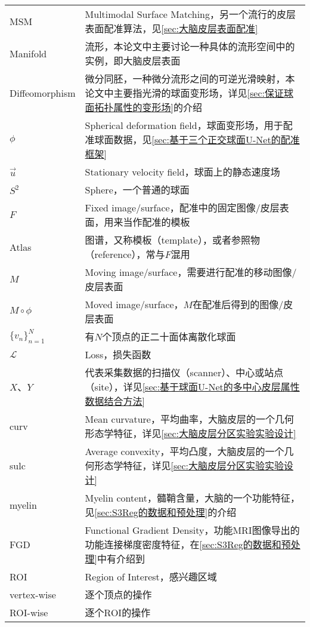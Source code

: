 \begin{center}
\begin{longtable}{>{\raggedleft}p{}  p{}}
            MSM & Multimodal Surface Matching，另一个流行的皮层表面配准算法，见\ref{sec:大脑皮层表面配准} \\
            Manifold & 流形，本论文中主要讨论一种具体的流形空间中的实例，即大脑皮层表面 \\
            Diffeomorphism & 微分同胚，一种微分流形之间的可逆光滑映射，本论文中主要指光滑的球面变形场，详见\ref{sec:保证球面拓扑属性的变形场}的介绍 \\
            $\phi$  & Spherical deformation field，球面变形场，用于配准球面数据，见\ref{sec:基于三个正交球面U-Net的配准框架} \\
            $\overrightarrow{u}$ &  Stationary velocity field，球面上的静态速度场 \\
            $S^2$ & Sphere，一个普通的球面 \\
            $F$ & Fixed image/surface，配准中的固定图像/皮层表面，用来当作配准的模板 \\
            Atlas & 图谱，又称模板（template），或者参照物（reference），常与$F$混用 \\
            $M$ & Moving image/surface，需要进行配准的移动图像/皮层表面 \\
            $M\circ \phi$ & Moved image/surface，$M$在配准后得到的图像/皮层表面 \\
            ${\{v_n\}}_{n=1}^N$ & 有$N$个顶点的正二十面体离散化球面 \\
            $\mathcal{L}$ & Loss，损失函数 \\
            $X$、$Y$ & 代表采集数据的扫描仪（scanner）、中心或站点（site），详见\ref{sec:基于球面U-Net的多中心皮层属性数据结合方法} \\
            curv      &    Mean curvature，平均曲率，大脑皮层的一个几何形态学特征，详见\ref{sec:大脑皮层分区实验实验设计} \\
            sulc      & Average convexity，平均凸度，大脑皮层的一个几何形态学特征，详见\ref{sec:大脑皮层分区实验实验设计} \\
            myelin   & Myelin content，髓鞘含量，大脑的一个功能特征，见\ref{sec:S3Reg的数据和预处理}的介绍 \\
            FGD     & Functional Gradient Density，功能MRI图像导出的功能连接梯度密度特征，在\ref{sec:S3Reg的数据和预处理}中有介绍到 \\
            ROI    &  Region of Interest，感兴趣区域 \\
            vertex-wise &  逐个顶点的操作 \\
            ROI-wise &  逐个ROI的操作 \\

\end{longtable}
\end{center}
